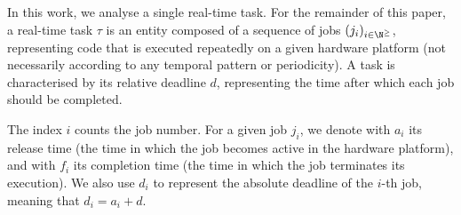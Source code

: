 In this work, we analyse a single real-time task. 
For the remainder of this paper, a real-time task $\tau$ is an entity composed of a sequence of jobs $(j_i)_{i \in \N^\geq}$, representing code that is executed repeatedly on a given hardware platform (not necessarily according to any temporal pattern or periodicity). 
A task is characterised by its relative deadline $d$, representing the time after which each job should be completed.

The index $i$ counts the job number. 
For a given job $j_i$, we denote with $a_i$ its release time (the time in which the job becomes active in the hardware platform), and with $f_i$ its completion time (the time in which the job terminates its execution). 
We also use $d_i$ to represent the absolute deadline of the $i$-th job, meaning that $d_i=a_i+d$.

